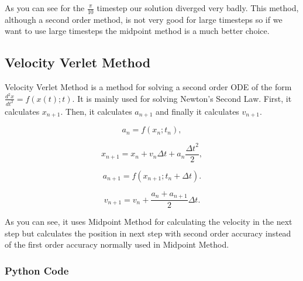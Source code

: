 \documentclass[11pt]{article}
\begin{document}
    As you can see for the \(\frac{\pi}{10}\) timestep our solution diverged
very badly. This method, although a second order method, is not very
good for large timesteps so if we want to use large timesteps the
midpoint method is a much better choice.

    \hypertarget{velocity-verlet-method}{%
\subsection{Velocity Verlet Method}\label{velocity-verlet-method}}

Velocity Verlet Method is a method for solving a second order ODE of the
form \(\frac{d^2 x}{{dt}^2}=f(x(t);t)\). It is mainly used for solving
Newton's Second Law. First, it calculates \(x_{n+1}\). Then, it
calculates \(a_{n+1}\) and finally it calculates \(v_{n+1}\).

\begin{equation}
    a_n = f(x_n;t_n),
\end{equation}

\begin{equation}
    x_{n+1} = x_n + v_n \Delta t + a_n \frac{{\Delta t}^2}{2},
\end{equation}

\begin{equation}
    a_{n+1} = f(x_{n+1};t_n+ \Delta t).
\end{equation}

\begin{equation}
    v_{n+1} = v_n + \frac{a_n + a_{n+1}}{2}\Delta t.
\end{equation}

As you can see, it uses Midpoint Method for calculating the velocity in
the next step but calculates the position in next step with second order
accuracy instead of the first order accuracy normally used in Midpoint
Method.

\hypertarget{python-code}{%
\subsubsection{Python Code}\label{python-code-5}}
\end{document}

